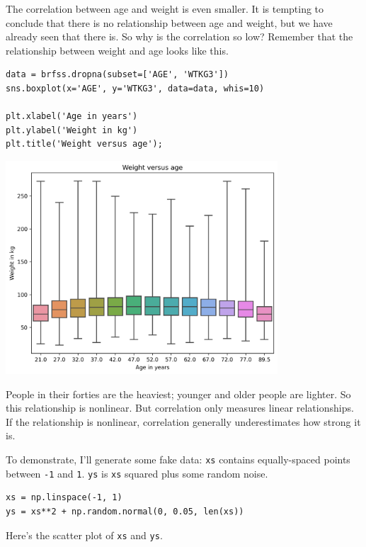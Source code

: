The correlation between age and weight is even smaller. It is tempting
to conclude that there is no relationship between age and weight, but we
have already seen that there is. So why is the correlation so low?
Remember that the relationship between weight and age looks like this.

\begin{lstlisting}[]
data = brfss.dropna(subset=['AGE', 'WTKG3'])
sns.boxplot(x='AGE', y='WTKG3', data=data, whis=10)

plt.xlabel('Age in years')
plt.ylabel('Weight in kg')
plt.title('Weight versus age');
\end{lstlisting}

\begin{center}
\includegraphics[width=4in]{chapters/09_relationships_files/09_relationships_57_0.png}
\end{center}

People in their forties are the heaviest; younger and older people are
lighter. So this relationship is nonlinear. But correlation only
measures linear relationships. If the relationship is nonlinear,
correlation generally underestimates how strong it is.

To demonstrate, I'll generate some fake data:
\passthrough{\lstinline!xs!} contains equally-spaced points between
\passthrough{\lstinline!-1!} and \passthrough{\lstinline!1!}.
\passthrough{\lstinline!ys!} is \passthrough{\lstinline!xs!} squared
plus some random noise.

\begin{lstlisting}[]
xs = np.linspace(-1, 1)
ys = xs**2 + np.random.normal(0, 0.05, len(xs))
\end{lstlisting}

Here's the scatter plot of \passthrough{\lstinline!xs!} and
\passthrough{\lstinline!ys!}.

